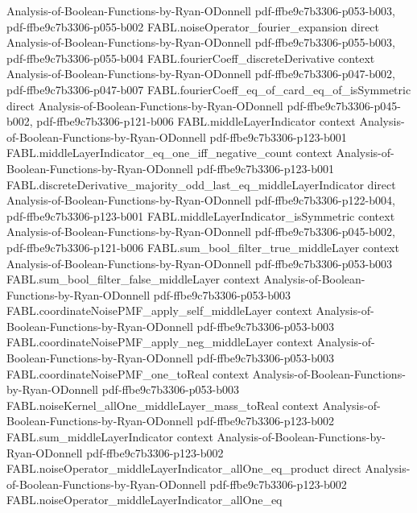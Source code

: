 \begin{theorem}
  {Analysis-of-Boolean-Functions-by-Ryan-ODonnell}
  {pdf-ffbe9c7b3306-p053-b003,
    pdf-ffbe9c7b3306-p055-b002}
\proofstep
  {FABL.noiseOperator_fourier_expansion}
  {direct}
  {Analysis-of-Boolean-Functions-by-Ryan-ODonnell}
  {pdf-ffbe9c7b3306-p055-b003,
    pdf-ffbe9c7b3306-p055-b004}
\proofstep
  {FABL.fourierCoeff_discreteDerivative}
  {context}
  {Analysis-of-Boolean-Functions-by-Ryan-ODonnell}
  {pdf-ffbe9c7b3306-p047-b002,
    pdf-ffbe9c7b3306-p047-b007}
\proofstep
  {FABL.fourierCoeff_eq_of_card_eq_of_isSymmetric}
  {direct}
  {Analysis-of-Boolean-Functions-by-Ryan-ODonnell}
  {pdf-ffbe9c7b3306-p045-b002,
    pdf-ffbe9c7b3306-p121-b006}
\proofstep
  {FABL.middleLayerIndicator}
  {context}
  {Analysis-of-Boolean-Functions-by-Ryan-ODonnell}
  {pdf-ffbe9c7b3306-p123-b001}
\proofstep
  {FABL.middleLayerIndicator_eq_one_iff_negative_count}
  {context}
  {Analysis-of-Boolean-Functions-by-Ryan-ODonnell}
  {pdf-ffbe9c7b3306-p123-b001}
\proofstep
  {FABL.discreteDerivative_majority_odd_last_eq_middleLayerIndicator}
  {direct}
  {Analysis-of-Boolean-Functions-by-Ryan-ODonnell}
  {pdf-ffbe9c7b3306-p122-b004,
    pdf-ffbe9c7b3306-p123-b001}
\proofstep
  {FABL.middleLayerIndicator_isSymmetric}
  {context}
  {Analysis-of-Boolean-Functions-by-Ryan-ODonnell}
  {pdf-ffbe9c7b3306-p045-b002,
    pdf-ffbe9c7b3306-p121-b006}
\proofstep
  {FABL.sum_bool_filter_true_middleLayer}
  {context}
  {Analysis-of-Boolean-Functions-by-Ryan-ODonnell}
  {pdf-ffbe9c7b3306-p053-b003}
\proofstep
  {FABL.sum_bool_filter_false_middleLayer}
  {context}
  {Analysis-of-Boolean-Functions-by-Ryan-ODonnell}
  {pdf-ffbe9c7b3306-p053-b003}
\proofstep
  {FABL.coordinateNoisePMF_apply_self_middleLayer}
  {context}
  {Analysis-of-Boolean-Functions-by-Ryan-ODonnell}
  {pdf-ffbe9c7b3306-p053-b003}
\proofstep
  {FABL.coordinateNoisePMF_apply_neg_middleLayer}
  {context}
  {Analysis-of-Boolean-Functions-by-Ryan-ODonnell}
  {pdf-ffbe9c7b3306-p053-b003}
\proofstep
  {FABL.coordinateNoisePMF_one_toReal}
  {context}
  {Analysis-of-Boolean-Functions-by-Ryan-ODonnell}
  {pdf-ffbe9c7b3306-p053-b003}
\proofstep
  {FABL.noiseKernel_allOne_middleLayer_mass_toReal}
  {context}
  {Analysis-of-Boolean-Functions-by-Ryan-ODonnell}
  {pdf-ffbe9c7b3306-p123-b002}
\proofstep
  {FABL.sum_middleLayerIndicator}
  {context}
  {Analysis-of-Boolean-Functions-by-Ryan-ODonnell}
  {pdf-ffbe9c7b3306-p123-b002}
\proofstep
  {FABL.noiseOperator_middleLayerIndicator_allOne_eq_product}
  {direct}
  {Analysis-of-Boolean-Functions-by-Ryan-ODonnell}
  {pdf-ffbe9c7b3306-p123-b002}
\proofstep
  {FABL.noiseOperator_middleLayerIndicator_allOne_eq}

\end{theorem}
